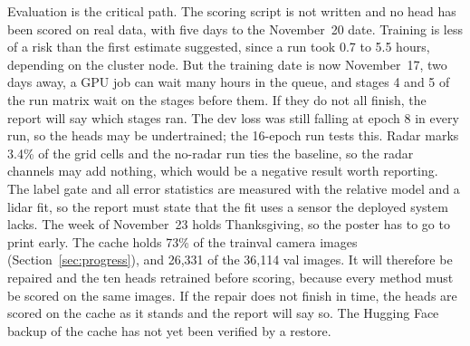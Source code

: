 Evaluation is the critical path. The scoring script is not written and no head has been scored on real data, with five days to the November~20 date. Training is less of a risk than the first estimate suggested, since a run took 0.7 to 5.5 hours, depending on the cluster node. But the training date is now November~17, two days away, a GPU job can wait many hours in the queue, and stages 4 and 5 of the run matrix wait on the stages before them. If they do not all finish, the report will say which stages ran. The dev loss was still falling at epoch 8 in every run, so the heads may be undertrained; the 16-epoch run tests this. Radar marks 3.4\% of the grid cells and the no-radar run ties the baseline, so the radar channels may add nothing, which would be a negative result worth reporting. The label gate and all error statistics are measured with the relative model and a lidar fit, so the report must state that the fit uses a sensor the deployed system lacks. The week of November~23 holds Thanksgiving, so the poster has to go to print early. The cache holds 73\% of the trainval camera images (Section~\ref{sec:progress}), and 26,331 of the 36,114 val images. It will therefore be repaired and the ten heads retrained before scoring, because every method must be scored on the same images. If the repair does not finish in time, the heads are scored on the cache as it stands and the report will say so. The Hugging Face backup of the cache has not yet been verified by a restore.
